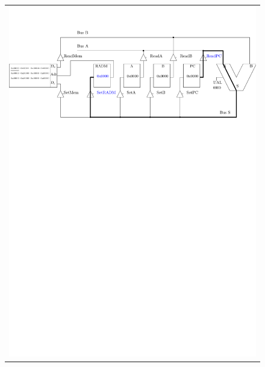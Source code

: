 \begin{figure}[htbp]
\begin{tabular}{c}
\includegraphics[width=\linewidth]{Figs/premier_chemin_lda_1.pdf}\\

\end{tabular}
\end{figure}
